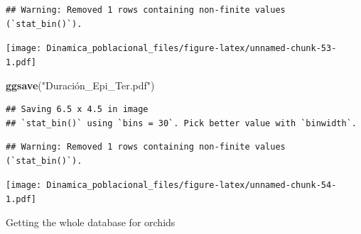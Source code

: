 \documentclass[
]{book}
\newenvironment{Shaded}{\begin{snugshade}}{\end{snugshade}}
\newcommand{\AttributeTok}[1]{\textcolor[rgb]{0.13,0.29,0.53}{#1}}
\newcommand{\FunctionTok}[1]{\textcolor[rgb]{0.13,0.29,0.53}{\textbf{#1}}}
\newcommand{\NormalTok}[1]{#1}
\newcommand{\OtherTok}[1]{\textcolor[rgb]{0.56,0.35,0.01}{#1}}
\newcommand{\SpecialCharTok}[1]{\textcolor[rgb]{0.81,0.36,0.00}{\textbf{#1}}}
\newcommand{\StringTok}[1]{\textcolor[rgb]{0.31,0.60,0.02}{#1}}
\theoremstyle{definition}
\theoremstyle{definition}
\theoremstyle{definition}
\theoremstyle{definition}
\theoremstyle{remark}
\begin{document}
\begin{verbatim}
## Warning: Removed 1 rows containing non-finite values (`stat_bin()`).
\end{verbatim}

\texttt{[image: Dinamica\_poblacional\_files/figure-latex/unnamed-chunk-53-1.pdf]}

\begin{Shaded}
\begin{Highlighting}[]
\FunctionTok{ggsave}\NormalTok{(}\StringTok{"Duración\_Epi\_Ter.pdf"}\NormalTok{)}
\end{Highlighting}
\end{Shaded}

\begin{verbatim}
## Saving 6.5 x 4.5 in image
## `stat_bin()` using `bins = 30`. Pick better value with `binwidth`.
\end{verbatim}

\begin{verbatim}
## Warning: Removed 1 rows containing non-finite values (`stat_bin()`).
\end{verbatim}

\begin{Shaded}
\end{Shaded}

\texttt{[image: Dinamica\_poblacional\_files/figure-latex/unnamed-chunk-54-1.pdf]}

Getting the whole database for orchids

\begin{Shaded}
\end{Shaded}
\end{document}

